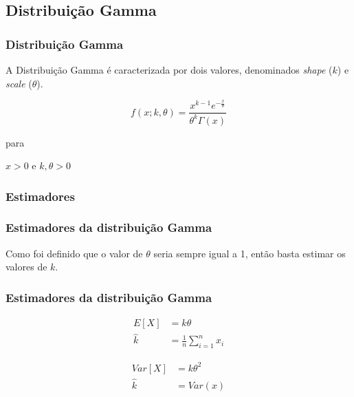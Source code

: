 \subsection{Distribuição Gamma}

 \begin{frame}
   \frametitle{Distribuição Gamma}

   A Distribuição Gamma é caracterizada por dois valores, denominados
   \textit{shape} ($k$) e \textit{scale} ($\theta$).

   \begin{dist}
     $$ f(x;k,\theta) = \frac{x^{k-1}e^{-\frac{x}{\theta}}}{\theta^k\Gamma(x)} $$ 

     \begin{center}
       para   

       $ x > 0 $ e $ k,\theta > 0 $ 
     \end{center}
   \end{dist}
 \end{frame}

\subsubsection{Estimadores}


\begin{frame}
  \frametitle{Estimadores da distribuição Gamma}

  Como foi definido que o valor de $\theta$ seria sempre igual a 1,
  então basta estimar os valores de $k$.

  \begin{emv}[Gamma]
    
  \end{emv}
\end{frame}
\begin{frame}
  \frametitle{Estimadores da distribuição Gamma}
  \begin{mo1}[Gamma]
    \begin{align*}
      E[X] &= k\theta \\
      \hat{k} &= \frac{1}{n} \sum_{i=1}^nx_i
    \end{align*}
  \end{mo1}
  
  \begin{mc2}[Gamma]
    \begin{align*}
      Var[X] &= k\theta^2 \\
      \hat{k} &= Var(x)
    \end{align*}
  \end{mc2}
\end{frame}

